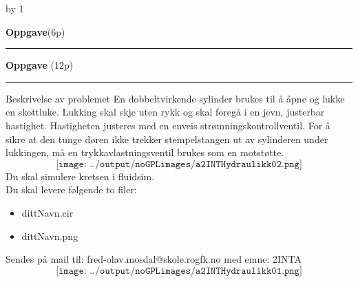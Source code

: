 \documentclass[12pt,a4paper]{article}
\def\oppgave{
            \advance\questnum by 1
	    \ifthenelse{\questnum>0\AND \questnum<9}
	    {
                \vskip 1cm
		\textbf{Oppgave}\hskip 5pt\the\questnum \hfill \hfill(6p)
		\vskip 3pt
		\hrule
	\vskip 0.5cm}
	{
                \vskip 1cm
		\textbf{Oppgave}\hskip 5pt \the\questnum \hfill \hfill(12p)
		\vskip 3pt \hrule \vskip 0.5cm }

		}
\begin{document}
\vskip 5pt 
\vskip 2.5pt 
\newpage
\oppgave{}%
\vskip 1cm 
Beskrivelse av problemet En dobbeltvirkende sylinder brukes til å åpne og lukke en skottluke. Lukking skal skje uten rykk og skal foregå i en jevn, justerbar hastighet. Hastigheten justeres med en enveis strømningskontrollventil.
\vskip 1cm 
For å sikre at den tunge døren ikke trekker stempelstangen ut av sylinderen under lukkingen, må en trykkavlastningsventil brukes som en motstøtte.
\vskip 1cm 
$$\texttt{[image: ../output/noGPLimages/a2INTHydraulikk02.png]}$$
\vskip 1cm 
Du skal simulere kretsen i fluidsim. \\
Du skal levere følgende to filer:
\begin{itemize}
	\item dittNavn.cir %
	\item dittNavn.png %
\end{itemize}

Sendes på mail til: fred-olav.mosdal@skole.rogfk.no
med emne: 2INTA
\vskip 1cm 
$$\texttt{[image: ../output/noGPLimages/a2INTHydraulikk01.png]}$$
\vskip 5pt 
\vskip 2.5pt 
\end{document}
